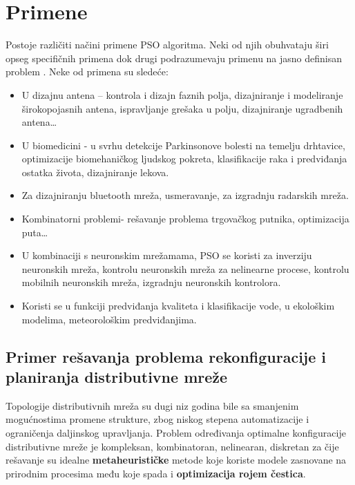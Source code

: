 \documentclass[a4paper]{article}
\begin{document}
\section{Primene}
Postoje različiti načini primene PSO algoritma. Neki od njih obuhvataju širi opseg specifičnih primena dok drugi podrazumevaju primenu na jasno definisan problem \cite{eberhart2001swarm}.
Neke od primena su sledeće:
\begin{itemize}
    \item U dizajnu antena – kontrola i dizajn faznih polja, dizajniranje i modeliranje širokopojasnih antena, ispravljanje grešaka u polju, dizajniranje ugradbenih antena…
    \item U biomedicini - u svrhu detekcije Parkinsonove bolesti na temelju drhtavice, optimizacije biomehaničkog ljudskog pokreta, klasifikacije raka i predviđanja ostatka života, dizajniranje lekova.
    \item Za dizajniranju bluetooth mreža, usmeravanje, za izgradnju radarskih mreža.
    \item Kombinatorni problemi- rešavanje problema trgovačkog putnika, optimizacija puta…
    \item U kombinaciji s neuronskim mrežamama, PSO se koristi za inverziju neuronskih mreža, kontrolu neuronskih mreža za nelinearne procese,  kontrolu mobilnih neuronskih mreža, izgradnju neuronskih kontrolora.
    \item Koristi se u funkciji predviđanja kvaliteta i klasifikacije vode, u ekološkim modelima, meteorološkim predviđanjima.
   
     
   
\end{itemize}

\subsection{Primer rešavanja problema rekonfiguracije i planiranja distributivne mreže}
\vspace{5mm} 


Topologije distributivnih mreža su dugi niz godina bile sa smanjenim mogućnostima promene strukture, zbog niskog stepena automatizacije i ograničenja daljinskog upravljanja. 
Problem određivanja optimalne konfiguracije distributivne mreže je kompleksan, kombinatoran, nelinearan, diskretan za čije rešavanje su idealne \textbf{metaheurističke} metode koje koriste modele zasnovane na prirodnim procesima među koje spada i \textbf{optimizacija rojem čestica}.
\end{document}
